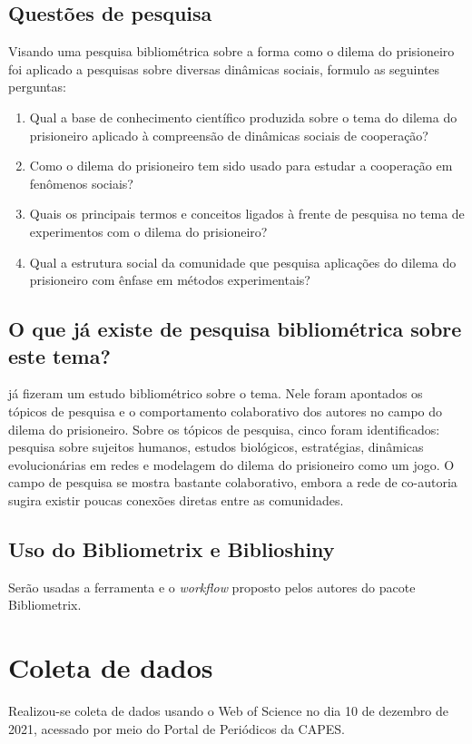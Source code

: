 \subsection{Questões de pesquisa}
\label{MASSA@joaoadm94:questoes}
Visando uma pesquisa bibliométrica sobre a forma como o dilema do prisioneiro foi aplicado a pesquisas sobre diversas dinâmicas sociais, formulo as seguintes perguntas:

\begin{enumerate}
    \item Qual a base de conhecimento científico produzida sobre o tema do dilema do prisioneiro aplicado à compreensão de dinâmicas sociais de cooperação?
    \item Como o dilema do prisioneiro tem sido usado para estudar a cooperação em fenômenos sociais?
    \item Quais os principais termos e conceitos ligados à frente de pesquisa no tema de experimentos com o dilema do prisioneiro?
    \item Qual a estrutura social da comunidade que pesquisa aplicações do dilema do prisioneiro com ênfase em métodos experimentais?
\end{enumerate}

\subsection{O que já existe de pesquisa bibliométrica sobre este tema?}

\cite{glynatsi_bibliometric_2021} já fizeram um estudo bibliométrico sobre o tema. Nele foram apontados os tópicos de pesquisa e o comportamento colaborativo dos autores no campo do dilema do prisioneiro. 
Sobre os tópicos de pesquisa, cinco foram identificados: pesquisa sobre sujeitos humanos, estudos biológicos, estratégias, dinâmicas evolucionárias em redes e modelagem do dilema do prisioneiro como um jogo. O campo de pesquisa se mostra bastante colaborativo, embora a rede de co-autoria sugira existir poucas conexões diretas entre as comunidades.

\subsection{Uso do Bibliometrix e Biblioshiny}
Serão usadas a ferramenta e o \textit{workflow} proposto pelos autores do pacote Bibliometrix.

\section{Coleta de dados}
\label{joaoadm94:coleta}
Realizou-se coleta de dados usando o Web of Science no dia 10 de dezembro de 2021, acessado por meio do Portal de Periódicos da CAPES.

